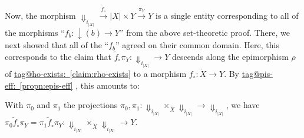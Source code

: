 \documentclass{amsart}
\makeatletter
\newcommand\abs[2][]{#1\lvert{#2}#1\rvert}
\newcommand\dwnfn{{\downarrow}}
\newcommand\Dwn{{\Downarrow}}
\newcommand\oring[1]{\mathring{#1}}
\newcommand\tox[2][]{\xrightarrow[#1]{#2}}
\newcommand\tagword[1]{\csname tag@#1\endcsname}
\def\label@tag#1:#2\@nil{#1}
\newcommand\labeltag[1]{\label@tag#1:\@nil}
\newcommand\jref[1]{%
  \texorpdfstring%
    {\hyperref[#1]{\tagword{\labeltag{#1}}~\ref*{#1}}}%
    {\tagword{\labeltag{#1}}~\ref*{#1}}%
}
\theoremstyle{definition}
\theoremstyle{remark}
\theoremstyle{plainwithref}
\makeatother
\begin{document}
Now, the morphism \( \Dwn_{i_{\abs X}} \tox{\tilde f_\circ} \abs X \times Y \tox{\pi_Y} Y \) is a single entity corresponding to all of the morphisms ``\( f_b \colon \dwnfn(b) \to Y \)'' from the above set-theoretic proof.
There, we next showed that all of the ``\( f_b \)'' agreed on their common domain.
Here, this corresponds to the claim that \( \tilde f_\circ \pi_Y \colon \Dwn_{i_{\abs X}} \to Y \) descends along the epimorphism \( \rho \) of \jref{claim:rho-exists} to a morphism \( f_\circ \colon \oring X \to Y \).
By \jref{propn:epis-eff}, this amounts to:
\begin{claim} \label{claim:f-well-def}
  With \( \pi_0 \) and \( \pi_1 \) the projections \( \pi_0,\pi_1 \colon \Dwn_{i_{\abs X}} \times_{\oring X} \Dwn_{i_{\abs X}} \to \Dwn_{i_{\abs X}} \), we have \( \pi_0 \tilde f_\circ \pi_Y = \pi_1 \tilde f_\circ \pi_Y \colon \Dwn_{i_{\abs X}} \times_{\oring X} \Dwn_{i_{\abs X}} \to Y \).
\end{claim}
\end{document}
